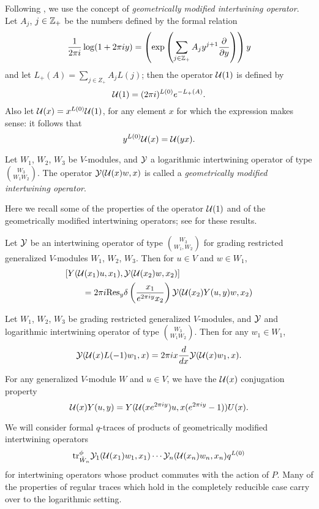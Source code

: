 \documentclass[12pt]{article}
\begin{document}
Following \cite{H2}, we use the concept of \emph{geometrically modified
intertwining operator}. Let $A_j$, $j\in \mathbb{Z}_+$ be the numbers defined by
the formal relation
$$
  \frac{1}{2\pi i} \log(1+2\pi i y) = \left( 
  \exp \left( \sum_{j\in \mathbb{Z}_+} A_j y^{j+1}\frac{\partial}{\partial y} \right)
  \right)y
$$
and let $L_+(A) = \sum_{j\in Z_+}A_j L(j)$;
then the operator $\mathcal{U}(1)$ is defined by
$$
  \mathcal{U}(1) = (2\pi i)^{L(0)}e^{-L_+(A)}.
$$
Also let $\mathcal{U}(x) = x^{L(0)}\mathcal{U}(1)$, for any element $x$ for which the
expression makes sense: it follows that
$$
y^{L(0)}\mathcal{U}(x) = \mathcal{U}(yx).
$$
\begin{defn}[\cite{H2}] {\rm Let $W_1$, $W_2$, $W_3$ be $V$-modules, and $\mathcal{Y}$ a
logarithmic intertwining operator of type $\binom{W_3}{W_1 W_2}$.
The operator $\mathcal{Y}(\mathcal{U}(x)w, x)$ is called a \emph{geometrically modified
intertwining operator}. }
\end{defn}
Here we recall some of the properties of the operator $\mathcal{U}(1)$ and
of the geometrically modified intertwining operators; see \cite{H2} for
these results.
\begin{lemma} 
  Let $\mathcal{Y}$ be an intertwining operator of type $\binom{W_3}{W_1,W_2}$ for grading
  restricted generalized $V$-modules $W_1$, $W_2$, $W_3$.
  Then for $u\in V$ and $w\in W_1$,
  \begin{align} \label{geom-commutator}
    &[Y(\mathcal{U}(x_1)u,x_1),\mathcal{Y}(\mathcal{U}(x_2)w,x_2)] \nonumber \\
    &\qquad= 2\pi i \mbox{\rm Res}_y \delta \left( \frac{x_1}{e^{2\pi iy}x_2} \right)
    \mathcal{Y}(\mathcal{U}(x_2)Y(u,y)w,x_2)
  \end{align}
\end{lemma}
\begin{lemma}
  Let $W_1$, $W_2$, $W_3$ be grading restricted generalized $V$-modules,
  and $\mathcal{Y}$ and logarithmic intertwining operator of type
  $\binom{W_3}{W_1 W_2}$.
  Then for any $w_1\in W_1$,
  \begin{equation} \label{L-1-derivative}
    \mathcal{Y}(\mathcal{U}(x)L(-1)w_1,x) = 2\pi ix \frac{d}{dx}\mathcal{Y}(\mathcal{U}(x)w_1, x).
  \end{equation}
\end{lemma}
\begin{lemma}
  For any generalized $V$-module $W$ and $u\in V$, we have
  the $\mathcal{U}(x)$ conjugation property
  \begin{equation} \label{U-conj}
    \mathcal{U}(x)Y(u,y) = Y(\mathcal{U}(xe^{2\pi i y})u, x(e^{2\pi i y} -1))U(x).
  \end{equation}
\end{lemma}
We will consider formal $q$-traces of products of geometrically modified
intertwining operators
$$
  \mbox{\rm tr}^\phi_{\tilde W_n} \mathcal{Y}_1(\mathcal{U}(x_1)w_1, x_1)\cdots\mathcal{Y}_n(\mathcal{U}(x_n)w_n, x_n)q^{L(0)}
$$
for intertwining operators whose product commutes with the action of $P$.
Many of the properties of regular traces which hold in the completely reducible case
carry over to the logarithmic setting.
\end{document}

